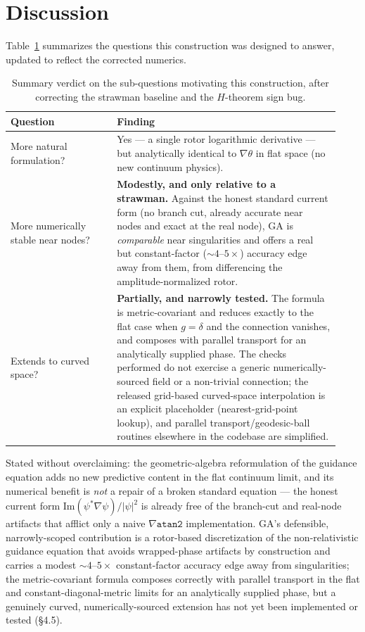\documentclass[11pt]{article}
\begin{document}
\section{Discussion}

Table~\ref{tab:verdict} summarizes the questions this construction was designed to answer, updated to reflect the corrected numerics.

\begin{table}[h]
\centering
\begin{tabular}{@{}p{0.30\linewidth}p{0.63\linewidth}@{}}
\toprule
Question & Finding \\
\midrule
More natural formulation? & Yes — a single rotor logarithmic derivative — but analytically identical to $\nabla \theta$ in flat space (no new continuum physics). \\
More numerically stable near nodes? & \textbf{Modestly, and only relative to a strawman.} Against the honest standard current form (no branch cut, already accurate near nodes and exact at the real node), GA is \emph{comparable} near singularities and offers a real but constant-factor ($\sim4$--$5\times$) accuracy edge away from them, from differencing the amplitude-normalized rotor. \\
Extends to curved space? & \textbf{Partially, and narrowly tested.} The formula is metric-covariant and reduces exactly to the flat case when $g=\delta$ and the connection vanishes, and composes with parallel transport for an analytically supplied phase. The checks performed do not exercise a generic numerically-sourced field or a non-trivial connection; the released grid-based curved-space interpolation is an explicit placeholder (nearest-grid-point lookup), and parallel transport/geodesic-ball routines elsewhere in the codebase are simplified. \\
\bottomrule
\end{tabular}
\caption{Summary verdict on the sub-questions motivating this construction, after correcting the strawman baseline and the $H$-theorem sign bug.}
\label{tab:verdict}
\end{table}

Stated without overclaiming: the geometric-algebra reformulation of the guidance equation adds no new predictive content in the flat continuum limit, and its numerical benefit is \emph{not} a repair of a broken standard equation — the honest current form $\mathrm{Im}(\psi^*\nabla\psi)/|\psi|^2$ is already free of the branch-cut and real-node artifacts that afflict only a naive $\nabla\mathtt{atan2}$ implementation. GA's defensible, narrowly-scoped contribution is a rotor-based discretization of the non-relativistic guidance equation that avoids wrapped-phase artifacts by construction and carries a modest $\sim4$--$5\times$ constant-factor accuracy edge away from singularities; the metric-covariant formula composes correctly with parallel transport in the flat and constant-diagonal-metric limits for an analytically supplied phase, but a genuinely curved, numerically-sourced extension has not yet been implemented or tested (\S4.5).
\end{document}

